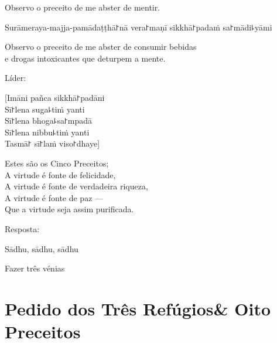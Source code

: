 \enlargethispage{\baselineskip}

\begin{english}
  Observo o preceito de me abster de mentir.
\end{english}

\clearpage

\begin{precept}
  \setcounter{enumi}{4}
  \item Surāmeraya-majja-pamādaṭṭhā꜓nā vera꜓maṇī sikkhā꜓padaṁ sa꜓mādi꜕yāmi
\end{precept}

\begin{english}
  Observo o preceito de me abster de consumir bebidas\\
  e drogas intoxicantes que deturpem a mente.
\end{english}

\begin{instruction}
  Líder:
\end{instruction}

[Imāni pañca sikkhā꜓padāni\\
Sī꜓lena suga꜕tiṁ yanti\\
Sī꜓lena bhoga꜕sa꜓mpadā\\
Sī꜓lena nibbu꜕tiṁ yanti\\
Tasmā꜓ sī꜓laṁ viso꜓dhaye]

\begin{english}
  Estes são os Cinco Preceitos;\\
  A virtude é fonte de felicidade,\\
  A virtude é fonte de verdadeira riqueza,\\
  A virtude é fonte de paz ---\\
  Que a virtude seja assim purificada.
\end{english}

\begin{instruction}
  Resposta:
\end{instruction}

Sādhu, sādhu, sādhu

\begin{instruction}
  Fazer três vénias
\end{instruction}

\clearpage
\chapter[Três Refúgios \& Oito Preceitos]{Pedido dos Três Refúgios\newline \& Oito Preceitos}

